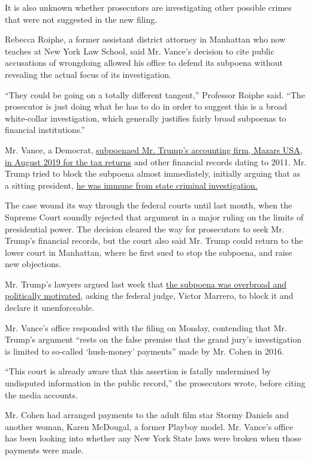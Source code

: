 It is also unknown whether prosecutors are investigating other possible
crimes that were not suggested in the new filing.

Rebecca Roiphe, a former assistant district attorney in Manhattan who
now teaches at New York Law School, said Mr. Vance's decision to cite
public accusations of wrongdoing allowed his office to defend its
subpoena without revealing the actual focus of its investigation.

``They could be going on a totally different tangent,'' Professor Roiphe
said. ``The prosecutor is just doing what he has to do in order to
suggest this is a broad white-collar investigation, which generally
justifies fairly broad subpoenas to financial institutions.''

Mr. Vance, a Democrat,
\href{https://www.nytimes.com/2019/09/16/nyregion/trump-tax-returns-cy-vance.html}{subpoenaed
Mr. Trump's accounting firm, Mazars USA, in August 2019 for the tax
returns} and other financial records dating to 2011. Mr. Trump tried to
block the subpoena almost immediately, initially arguing that as a
sitting president,
\href{https://www.nytimes.com/2019/09/19/nyregion/trump-tax-returns-lawsuit.html}{he
was immune from state criminal investigation.}

The case wound its way through the federal courts until last month, when
the Supreme Court soundly rejected that argument in a major ruling on
the limits of presidential power. The decision cleared the way for
prosecutors to seek Mr. Trump's financial records, but the court also
said Mr. Trump could return to the lower court in Manhattan, where he
first sued to stop the subpoena, and raise new objections.

Mr. Trump's lawyers argued last week that
\href{https://www.nytimes.com/2020/07/27/nyregion/donald-trump-taxes-cyrus-vance.html}{the
subpoena was overbroad and politically motivated}, asking the federal
judge, Victor Marrero, to block it and declare it unenforceable.

Mr. Vance's office responded with the filing on Monday, contending that
Mr. Trump's argument ``rests on the false premise that the grand jury's
investigation is limited to so-called `hush-money' payments'' made by
Mr. Cohen in 2016.

``This court is already aware that this assertion is fatally undermined
by undisputed information in the public record,'' the prosecutors wrote,
before citing the media accounts.

Mr. Cohen had arranged payments to the adult film star Stormy Daniels
and another woman, Karen McDougal, a former Playboy model. Mr. Vance's
office has been looking into whether any New York State laws were broken
when those payments were made.

